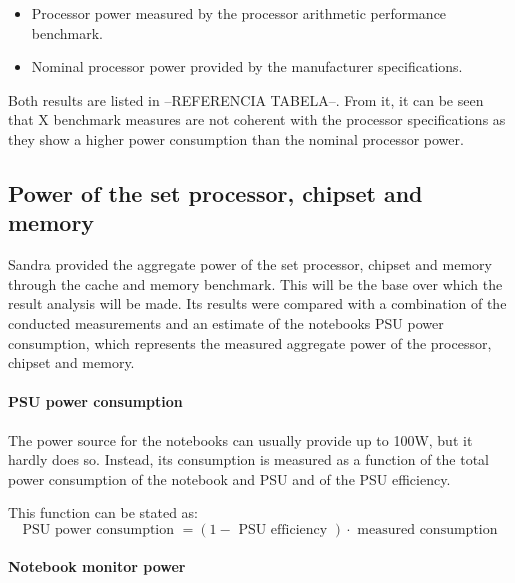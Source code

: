         \begin{itemize}
            \item Processor power measured by the processor arithmetic performance benchmark.
            \item Nominal processor power provided by the manufacturer specifications.
        \end{itemize}
        
        Both results are listed in --REFERENCIA TABELA--. From it, it can be seen that X benchmark measures are not coherent with the processor specifications as they show a higher power consumption than the nominal processor power.
        
    \subsection{Power of the set processor, chipset and  memory} \label{sec4:processor_power}
        
        Sandra provided the aggregate power of the set processor, chipset and memory through the cache and memory benchmark. This will be the base over which the result analysis will be made. Its results were compared with a combination of the conducted measurements and an estimate of the notebooks PSU power consumption, which represents the measured aggregate power of the processor, chipset and memory.
        
        \paragraph*{PSU power consumption}
            
            The power source for the notebooks can usually provide up to 100W, but it hardly does so. Instead, its consumption is measured as a function of the total power consumption of the notebook and PSU and of the PSU efficiency.
            
            This function can be stated as:
            \begin{equation}
                \text{ PSU power consumption } = (1 - \text{ PSU efficiency }) \cdot \text{ measured consumption }
                \label{psu_consumption}
            \end{equation}

        \paragraph*{Notebook monitor power}
        

